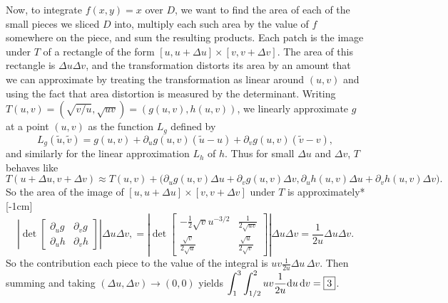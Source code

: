 \documentclass{watsonbook}
\begin{document}
\begin{solution}
  Now, to integrate $f(x,y) = x$ over $D$, we want to find the area of
  each of the small pieces we sliced $D$ into, multiply each such area by
  the value of $f$ somewhere on the piece, and sum the resulting
  products. Each patch is the image under $T$ of a rectangle of the
  form $[u, u+\Delta u] \times [v, v + \Delta v]$. The area of this
  rectangle is $\Delta u \Delta v$, and the transformation distorts
  its area by an amount that we can approximate by treating the
  transformation as linear around $(u,v)$ and using the fact that area
  distortion is measured by the determinant. Writing $T(u,v) =
  (\sqrt{v/u}, \sqrt{uv}) = (g(u,v), h(u,v))$, we linearly 
  approximate $g$ at a point $(u,v)$ as the function $L_g$ defined by
  \[
    L_g(\widetilde{u},\widetilde{v}) = g(u,v) + \partial_ug(u,v)(\widetilde{u} -
    u)+ \partial_vg(u,v)(\widetilde{v} -v), 
  \]
  and similarly for the linear approximation $L_h$ of $h$. Thus for
  small $\Delta u$ and $\Delta v$, $T$ behaves like  
  \begin{equation} \label{eq:Tuv} 
    T(u + \Delta u, v + \Delta v) \approx T(u,v) + \big( \partial_ug(u,v)
    \Delta u + \partial_v g(u,v) \Delta v, \partial_uh(u,v)
    \Delta u + \partial_v h(u,v) \Delta v \big). 
  \end{equation}
  So the area of the image of
  $[u, u+\Delta u] \times [v, v + \Delta v]$ under $T$ is
  approximately* [-1cm]
  \[
    \left| \det \left[
      \begin{array}{cc}
        \partial_u g & \partial _v g\\
        \partial_u h & \partial _v h 
      \end{array} \right]
    \right|\Delta u \Delta v,  =
    \left| \det \left[
      \begin{array}{cc}
        -\frac{1}{2}\sqrt{v}u^{-3/2} & \frac{1}{2\sqrt{uv}} \\
        \frac{\sqrt{v}}{2\sqrt{u}} & \frac{\sqrt{u}}{2\sqrt{v}}
      \end{array} \right]
      \right| \Delta u \Delta v  = \frac{1}{2u}
      \Delta u \Delta v. 
    \]
    So the contribution each piece to the value of the integral is
    $uv \frac{1}{2u} \Delta u \, {\Delta}v$. Then summing and taking
    $(\Delta u, \Delta v) \to (0,0)$ yields
    $\displaystyle{\int_{1}^{3}\int_{1/2}^{2}uv \frac{1}{2u} \mathrm{d}u \,
      {\mathrm{d}}v = \boxed{3}}$.
  \end{solution}
\end{document}
